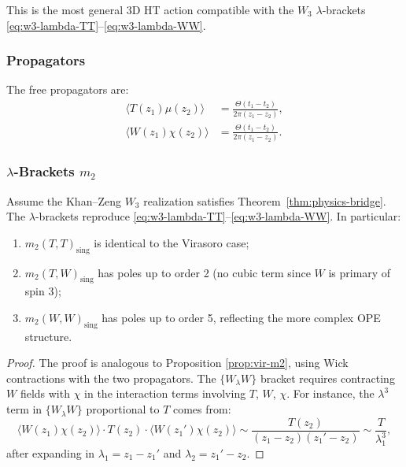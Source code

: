 This is the most general 3D HT action compatible with the $W_3$ $\lambda$-brackets \eqref{eq:w3-lambda-TT}--\eqref{eq:w3-lambda-WW}.

\subsubsection{Propagators}

The free propagators are:
\begin{align}
\langle T(z_1) \mu(z_2) \rangle &= \frac{\Theta(t_1-t_2)}{2\pi(z_1-z_2)},\\
\langle W(z_1) \chi(z_2) \rangle &= \frac{\Theta(t_1-t_2)}{2\pi(z_1-z_2)}.
\end{align}

\subsubsection{$\lambda$-Brackets $m_2$}

\begin{proposition}
Assume the Khan--Zeng $W_3$ realization satisfies
Theorem~\ref{thm:physics-bridge}.
The $\lambda$-brackets reproduce \eqref{eq:w3-lambda-TT}--\eqref{eq:w3-lambda-WW}. In particular:
\begin{enumerate}
\item $m_2(T,T)_{\text{sing}}$ is identical to the Virasoro case;
\item $m_2(T,W)_{\text{sing}}$ has poles up to order 2 (no cubic term since $W$ is primary of spin 3);
\item $m_2(W,W)_{\text{sing}}$ has poles up to order 5, reflecting the more complex OPE structure.
\end{enumerate}
\end{proposition}

\begin{proof}
The proof is analogous to Proposition \ref{prop:vir-m2}, using Wick contractions with the two propagators. The $\{W_\lambda W\}$ bracket requires contracting $W$ fields with $\chi$ in the interaction terms involving $T$, $W$, $\chi$. For instance, the $\lambda^3$ term in $\{W_\lambda W\}$ proportional to $T$ comes from:
\[
\langle W(z_1) \chi(z_2) \rangle \cdot T(z_2) \cdot \langle W(z_1') \chi(z_2) \rangle \sim \frac{T(z_2)}{(z_1-z_2)(z_1'-z_2)} \sim \frac{T}{\lambda_1^3},
\]
after expanding in $\lambda_1 = z_1 - z_1'$ and $\lambda_2 = z_1' - z_2$.
\end{proof}

